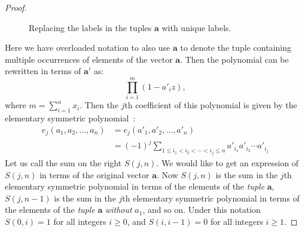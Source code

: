 \documentclass[pdflatex,sn-mathphys-num]{sn-jnl}
\theoremstyle{definition}
\newcommand{\vtr}[1]{\mathbf{#1}}
\begin{document}
\begin{proof}
\begin{figure}
    \caption{Replacing the labels in the tuples $\vtr{a}$ with unique labels.}
    \label{fig:relabel}
\end{figure}

Here we have overloaded notation to also use $\vtr{a}$ to denote the tuple containing multiple occurrences of elements of the vector $\vtr{a}$. Then the polynomial can be rewritten in terms of $\vtr{a}'$ as:
\[
\prod_{i = 1}^m (1 - a'_iz),
\]
where $m = \sum_{i = 1}^n x_i$. Then the $j$th coefficient of this polynomial is given by the elementary symmetric polynomial~\cite[\S 8]{toecc-book}:
\begin{align*}
   e_j(a_1, a_2, \ldots, a_n) &= e_j(a'_1, a'_2, \ldots, a'_n) \\
   &= (-1)^j \sum_{1 \leq i_1 < i_2 < \cdots < i_j \leq n} a'_{i_1}a'_{i_2}\cdots a'_{i_j} 
\end{align*}
Let us call the sum on the right $S(j, n)$. We would like to get an expression of $S(j, n)$ in terms of the original vector $\vtr{a}$. Now $S(j, n)$ is the sum in the $j$th elementary symmetric polynomial in terms of the elements of the \emph{tuple} $\vtr{a}$, $S(j, n-1)$ is the sum in the $j$th elementary symmetric polynomial in terms of the elements of the \emph{tuple} $\vtr{a}$ \emph{without} $a_1$, and so on. Under this notation $S(0, i) = 1$ for all integers $i \geq 0$, and $S(i, i -1) = 0$ for all integers $i \geq 1$. 


\end{proof}
\end{document}
